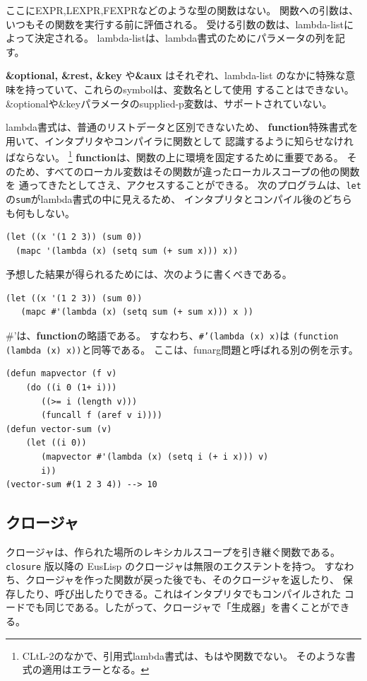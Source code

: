 ここにEXPR,LEXPR,FEXPRなどのような型の関数はない。
関数への引数は、いつもその関数を実行する前に評価される。
受ける引数の数は、lambda-listによって決定される。
lambda-listは、lambda書式のためにパラメータの列を記す。

{\bf \&optional, \&rest, \&key }や{\bf \&aux} はそれぞれ、lambda-list
のなかに特殊な意味を持っていて、これらのsymbolは、変数名として使用
することはできない。
\&optionalや\&keyパラメータのsupplied-p変数は、サポートされていない。

lambda書式は、普通のリストデータと区別できないため、
{\bf function}特殊書式を用いて、インタプリタやコンパイラに関数として
認識するように知らせなければならない。
\footnote{CLtL-2のなかで、引用式lambda書式は、もはや関数でない。
そのような書式の適用はエラーとなる。}
{\bf function}は、関数の上に環境を固定するために重要である。
そのため、すべてのローカル変数はその関数が違ったローカルスコープの他の関数を
通ってきたとしてさえ、アクセスすることができる。
次のプログラムは、{\tt let}の{\tt sum}がlambda書式の中に見えるため、
インタプリタとコンパイル後のどちらも何もしない。


\begin{verbatim}
(let ((x '(1 2 3)) (sum 0))
  (mapc '(lambda (x) (setq sum (+ sum x))) x))
\end{verbatim}

予想した結果が得られるためには、次のように書くべきである。
\begin{verbatim}
(let ((x '(1 2 3)) (sum 0))
   (mapc #'(lambda (x) (setq sum (+ sum x))) x ))
\end{verbatim}

\#'は、{\bf function}の略語である。
すなわち、{\tt \#'(lambda (x) x)}は
{\tt (function (lambda (x) x))}と同等である。
ここは、funarg問題と呼ばれる別の例を示す。

\begin{verbatim}
(defun mapvector (f v)
    (do ((i 0 (1+ i)))
       ((>= i (length v)))
       (funcall f (aref v i))))
(defun vector-sum (v)
    (let ((i 0))
       (mapvector #'(lambda (x) (setq i (+ i x))) v)
       i))
(vector-sum #(1 2 3 4)) --> 10 
\end{verbatim}

\subsection{クロージャ}

クロージャは、作られた場所のレキシカルスコープを引き継ぐ関数である。
{\tt closure} 版以降の EusLisp のクロージャは無限のエクステントを持つ。
すなわち、クロージャを作った関数が戻った後でも、そのクロージャを返したり、
保存したり、呼び出したりできる。これはインタプリタでもコンパイルされた
コードでも同じである。したがって、クロージャで「生成器」を書くことができる。

